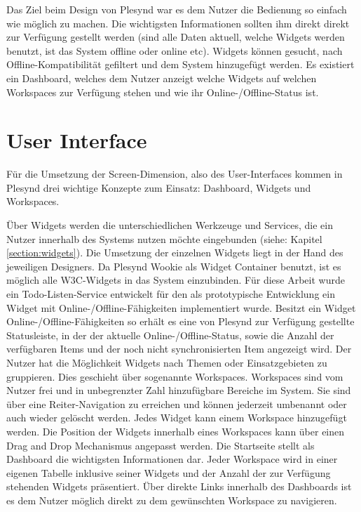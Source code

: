Das Ziel beim Design von Plesynd war es dem Nutzer die Bedienung so einfach wie möglich zu machen. Die wichtigsten Informationen sollten ihm direkt direkt zur Verfügung gestellt werden (sind alle Daten aktuell, welche Widgets werden benutzt, ist das System offline oder online etc). Widgets können gesucht, nach Offline-Kompatibilität gefiltert und dem System hinzugefügt werden. Es existiert ein Dashboard, welches dem Nutzer anzeigt welche Widgets auf welchen Workspaces zur Verfügung stehen und wie ihr Online-/Offline-Status ist. 

\section{User Interface}\label{section:user_interface}
Für die Umsetzung der Screen-Dimension, also des User-Interfaces kommen in Plesynd drei wichtige Konzepte zum Einsatz: Dashboard, Widgets und Workspaces. 

Über Widgets werden die unterschiedlichen Werkzeuge und Services, die ein Nutzer innerhalb des Systems nutzen möchte eingebunden (siehe: Kapitel \ref{section:widgets}). Die Umsetzung der einzelnen Widgets liegt in der Hand des jeweiligen Designers. Da Plesynd Wookie als Widget Container benutzt, ist es möglich alle W3C-Widgets in das System einzubinden. Für diese Arbeit wurde ein Todo-Listen-Service entwickelt für den als prototypische Entwicklung ein Widget mit Online-/Offline-Fähigkeiten implementiert wurde. Besitzt ein Widget Online-/Offline-Fähigkeiten so erhält es eine von Plesynd zur Verfügung gestellte Statusleiste, in der der aktuelle Online-/Offline-Status, sowie die Anzahl der verfügbaren Items und der noch nicht synchronisierten Item angezeigt wird. Der Nutzer hat die Möglichkeit Widgets nach Themen oder Einsatzgebieten zu gruppieren. Dies geschieht über sogenannte Workspaces. Workspaces sind vom Nutzer frei und in unbegrenzter Zahl hinzufügbare Bereiche im System. Sie sind über eine Reiter-Navigation zu erreichen und können jederzeit umbenannt oder auch wieder gelöscht werden. Jedes Widget kann einem Workspace hinzugefügt werden. Die Position der Widgets innerhalb eines Workspaces kann über einen Drag and Drop Mechanismus angepasst werden. Die Startseite stellt als Dashboard die wichtigsten Informationen dar. Jeder Workspace wird in einer eigenen Tabelle inklusive seiner Widgets und der Anzahl der zur Verfügung stehenden Widgets präsentiert. Über direkte Links innerhalb des Dashboards ist es dem Nutzer möglich direkt zu dem gewünschten Workspace zu navigieren.

